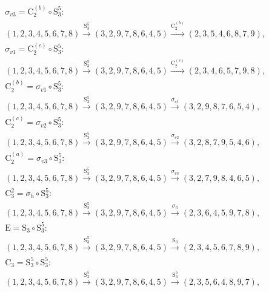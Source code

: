 \begin{align*}
& \sigma_{v3} = \mathrm{C}_{2}^{(b)} \circ \mathrm{S}_{3}^{5}:\; \\& (1,2,3,4,5,6,7,8) \xrightarrow{\mathrm{S}_{3}^{5}} (3,2,9,7,8,6,4,5) \xrightarrow{\mathrm{C}_{2}^{(b)}} (2,3,5,4,6,8,7,9), \\
& \sigma_{v1} = \mathrm{C}_{2}^{(c)} \circ \mathrm{S}_{3}^{5}:\; \\& (1,2,3,4,5,6,7,8) \xrightarrow{\mathrm{S}_{3}^{5}} (3,2,9,7,8,6,4,5) \xrightarrow{\mathrm{C}_{2}^{(c)}} (2,3,4,6,5,7,9,8), \\
& \mathrm{C}_{2}^{(b)} = \sigma_{v1} \circ \mathrm{S}_{3}^{5}:\; \\& (1,2,3,4,5,6,7,8) \xrightarrow{\mathrm{S}_{3}^{5}} (3,2,9,7,8,6,4,5) \xrightarrow{\sigma_{v1}} (3,2,9,8,7,6,5,4), \\
& \mathrm{C}_{2}^{(c)} = \sigma_{v2} \circ \mathrm{S}_{3}^{5}:\; \\& (1,2,3,4,5,6,7,8) \xrightarrow{\mathrm{S}_{3}^{5}} (3,2,9,7,8,6,4,5) \xrightarrow{\sigma_{v2}} (3,2,8,7,9,5,4,6), \\
& \mathrm{C}_{2}^{(a)} = \sigma_{v3} \circ \mathrm{S}_{3}^{5}:\; \\& (1,2,3,4,5,6,7,8) \xrightarrow{\mathrm{S}_{3}^{5}} (3,2,9,7,8,6,4,5) \xrightarrow{\sigma_{v3}} (3,2,7,9,8,4,6,5), \\
& \mathrm{C}_{3}^{2} = \sigma_{h} \circ \mathrm{S}_{3}^{5}:\; \\& (1,2,3,4,5,6,7,8) \xrightarrow{\mathrm{S}_{3}^{5}} (3,2,9,7,8,6,4,5) \xrightarrow{\sigma_{h}} (2,3,6,4,5,9,7,8), \\
& \mathrm{E} = \mathrm{S}_{3} \circ \mathrm{S}_{3}^{5}:\; \\& (1,2,3,4,5,6,7,8) \xrightarrow{\mathrm{S}_{3}^{5}} (3,2,9,7,8,6,4,5) \xrightarrow{\mathrm{S}_{3}} (2,3,4,5,6,7,8,9), \\
& \mathrm{C}_{3} = \mathrm{S}_{3}^{5} \circ \mathrm{S}_{3}^{5}:\; \\& (1,2,3,4,5,6,7,8) \xrightarrow{\mathrm{S}_{3}^{5}} (3,2,9,7,8,6,4,5) \xrightarrow{\mathrm{S}_{3}^{5}} (2,3,5,6,4,8,9,7), \\
\end{align*}